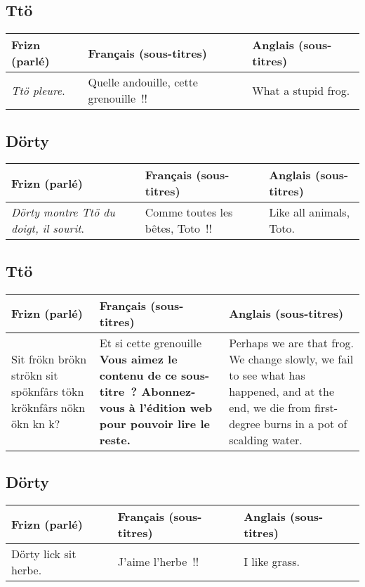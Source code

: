 \subsection*{Ttö}
\begin{tabular}{|p{2in}|p{2in}|p{2in}|}\hline
Frizn (parlé) & Français (sous-titres) & Anglais (sous-titres) \\\hline
\emph{Ttö pleure}. &
Quelle andouille, cette grenouille~!! &
What a stupid frog.\\\hline
\end{tabular}\par
\subsection*{Dörty}
\begin{tabular}{|p{2in}|p{2in}|p{2in}|}\hline
Frizn (parlé) & Français (sous-titres) & Anglais (sous-titres) \\\hline
\emph{Dörty montre Ttö du doigt, il sourit}. &
Comme toutes les bêtes, Toto~!! &
Like all animals, Toto.\\\hline
\end{tabular}

\subsection*{Ttö}
\begin{tabular}{|p{2in}|p{2in}|p{2in}|}\hline
Frizn (parlé) & Français (sous-titres) & Anglais (sous-titres) \\\hline
Sit frökn brökn strökn sit spöknfårs tökn kröknfårs nökn ökn kn k? &
Et si cette grenouille \textbf{Vous aimez le contenu de ce sous-titre~? Abonnez-vous
à l'édition web pour pouvoir lire le reste.} &
Perhaps we are that frog.  We change slowly, we fail to see what has
happened, and at the end, we die from first-degree burns in a pot of
scalding water.\\\hline
\end{tabular}

\subsection*{Dörty}
\begin{tabular}{|p{2in}|p{2in}|p{2in}|}\hline
Frizn (parlé) & Français (sous-titres) & Anglais (sous-titres) \\\hline
Dörty lick sit herbe. &
J'aime l'herbe~!! &
I like grass.\\\hline
\end{tabular}\par

